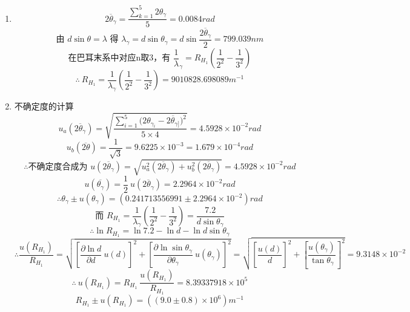 \documentclass[11pt,a4paper,oneside]{article}
\begin{document}
\begin{enumerate}
  \item { }
      $$\overline{2{\theta}_{\gamma}} = \displaystyle\frac{\sum_{k=1}^5 2{\theta}_{\gamma}}{5} = 0.0084rad$$
      $$\displaystyle\text{由\ }d\sin{\theta} = {\lambda}\text{\ 得\ }{\lambda}_{\gamma} = d\sin{\theta}_{\gamma} = d\sin{\frac{\overline{2{\theta}_{\gamma}}}{2}} = 799.039 nm $$
      $$\displaystyle\text{在巴耳末系中对应n取3，有\ }\frac{1}{\lambda}_{\gamma} = R_{H_1}\left(\frac{1}{2^2}-\frac{1}{3^2}\right)$$
      $$\therefore\ \displaystyle R_{H_{1}} = \frac{1}{ {\lambda}_{\gamma}}\left(\frac{1}{2^2}-\frac{1}{3^2}\right) = 9010828.698089m^{-1}$$
  \item {不确定度的计算}
      $$u_a(\overline{2{\theta}_{\gamma}}) = \displaystyle\sqrt{\frac{\sum_{i=1}^{5} {(2{\theta}_{ {\gamma}_{i}}-\overline{2{\theta}_{\gamma]}}})^2}{5\times4}}=4.5928{\times}10^{-2}rad$$
      $$u_b(\overline{2\theta}) = \displaystyle\frac{1}{\sqrt3} = 9.6225\times10^{-3} = 1.679 \times 10^{-4} rad$$
      $$\therefore\text{不确定度合成为\ }u(\overline{2{\theta}_{\gamma}}) = \sqrt{u_a^2(\overline{2{\theta}_{\gamma}})+u_b^2(\overline{2{\theta}_{\gamma}})} = 4.5928{\times}10^{-2}rad$$
      $$u(\overline{ {\theta}_{\gamma}})= \displaystyle\frac12\ u(\overline{2{\theta}_{\gamma}}) = 2.2964{\times}10^{-2}rad$$
      $$\therefore{\theta}_{\gamma} \pm u({\theta}_{\gamma}) = (0.241713556991 \pm 2.2964{\times}10^{-2})rad$$
      $$\text{而\ }\displaystyle R_{H_1} = \frac{1}{ {\lambda}_{\gamma}}\left(\frac{1}{2^2}-\frac{1}{3^2}\right) = \frac{7.2}{d\sin{\theta}_{\gamma}}$$
      $$\therefore\ln{R_{H_1}} = \ln{7.2} -\ln{d} - \ln{d\sin{\theta}_{\gamma}}$$
      $$\therefore\displaystyle \frac{u(R_{H_1})}{R_{H_1}} = \sqrt{ {\left[\frac{\partial{\ln{d}}}{\partial{d}}\ u(d)\right]}^2 + {\left[\frac{\partial{\ln{\sin{ {\theta}_{\gamma}}}}}{\partial{ {\theta}_{\gamma}}}\ u({\theta}_{\gamma})\right]}^2} = \sqrt{  {\left[\frac{u(d)}{d}\right]}^2 + {\left[\frac{u({\theta}_{\gamma})}{\tan{ {\theta}_{\gamma}}}\right]}^2} = 9.3148{\times}10^{-2}$$
      $$\therefore \ u(R_{H_1}) = \displaystyle R_{H_1}\ \frac{u(R_{H_1})}{R_{H_1}} = 8.39337918{\times}10^{5}$$ 
      $$R_{H_1} \pm u(R_{H_1}) = ((9.0\pm0.8){\times}10^{6})m^{-1}$$
\end{enumerate}
\end{document}
